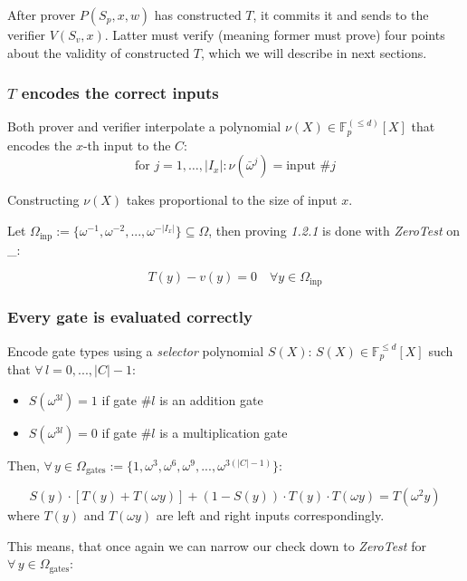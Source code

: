 \documentclass[../lecture-notes.tex]{subfiles}
\begin{document}
After prover \(P(S_p, x, w)\) has constructed \(T\), it commits it and sends to the verifier \(V(S_v, x)\). Latter must verify (meaning former must prove) four points about the validity of constructed \(T\), which we will describe in next sections.

\subsubsection{\(T\) encodes the correct inputs}
Both prover and verifier interpolate a polynomial \(\nu(X) \in \mathbb{F}_p^{(\leq d)}[X] \) that encodes the \(x\)-th input to the \(C\):
\[\text{for } j = 1, \dots, |I_x| : \nu(\bar{\omega}^j) = \text{input } \#j\]

\begin{remark}
Constructing \(\nu(X)\) takes proportional to the size of input \(x\).
\end{remark}

Let \(\Omega_{\text{inp}} := \{ \omega^{-1}, \omega^{-2}, ..., \omega^{-|I_x|} \} \subseteq \Omega\), then proving \textit{1.2.1} is done with \textit{ZeroTest} on \Omega_{}:

\[T(y) - v(y) = 0 \quad \forall y \in \Omega_{\text{inp}}\]

\subsubsection{Every gate is evaluated correctly}

Encode gate types using a \textit{selector} polynomial \(S(X)\):
\(S(X) \in \mathbb{F}_p^{\leq d}[X]\) such that \(\forall \, l = 0, ..., |C| - 1\): 
\begin{itemize}
    \item \(S(\omega^{3l}) = 1\) if gate \(\#l\) is an addition gate 
    \item \(S(\omega^{3l}) = 0\) if gate \(\#l\) is a multiplication gate 
\end{itemize}

Then, \(\forall \, y \in \Omega_{\text{gates}} := \{ 1, \omega^3, \omega^6, \omega^9, ..., \omega^{3(|C|-1)} \}\):

\[S(y) \cdot [T(y) + T(\omega y)] + (1 - S(y)) \cdot T(y) \cdot T(\omega y) = T(\omega^2 y)\]
where \(T(y)\) and \(T(\omega y)\) are left and right inputs correspondingly.

This means, that once again we can narrow our check down to \textit{ZeroTest} for \(\forall \, y \in \Omega_{\text{gates}}\):
\end{document}
